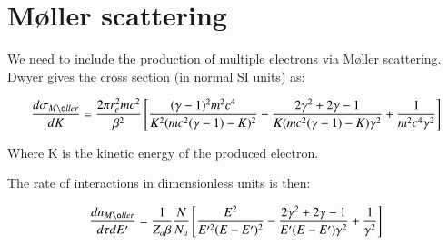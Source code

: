 \documentclass[]{article}
\begin{document}
%
%

\section{M\o ller scattering}

We need to include the production of multiple electrons via M\o ller scattering. Dwyer gives the cross section (in normal SI units) as:

\begin{equation} 
\frac{d\sigma_{M\o ller}}{d K} = \frac{2\pi r_e^2 m c^2}{\beta^2}\left[  \frac{(\gamma-1)^2m^2c^4}{K^2(mc^2(\gamma-1)-K)^2} - \frac{2\gamma^2 + 2\gamma -1}{K(mc^2(\gamma-1)-K)\gamma^2}  + \frac{1}{m^2c^4\gamma^2}  \right]
\end{equation}

Where K is the kinetic energy of the produced electron.

The rate of interactions in dimensionless units is then:

\begin{equation} 
\label{dimensionless_moller_scattering_eq}
\frac{dn_{M\o ller}}{d\tau d E'} = \frac{1}{Z_a \beta} \frac{N}{N_a} \left[  \frac{E^2}{E'^2(E-E')^2} - \frac{2\gamma^2 + 2\gamma -1}{E'(E-E')\gamma^2}  + \frac{1}{\gamma^2}  \right]
\end{equation}
\end{document}
